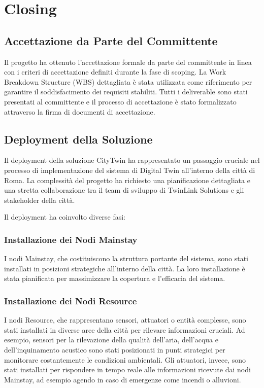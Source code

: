 \chapter{Closing}

\section{Accettazione da Parte del Committente}
Il progetto ha ottenuto l'accettazione formale da parte del committente in linea con i criteri di accettazione definiti durante la fase di scoping. La Work Breakdown Structure (WBS) dettagliata è stata utilizzata come riferimento per garantire il soddisfacimento dei requisiti stabiliti. Tutti i deliverable sono stati presentati al committente e il processo di accettazione è stato formalizzato attraverso la firma di documenti di accettazione.

\section{Deployment della Soluzione}
Il deployment della soluzione CityTwin ha rappresentato un passaggio cruciale nel processo di implementazione del sistema di Digital Twin all'interno della città di Roma. La complessità del progetto ha richiesto una pianificazione dettagliata e una stretta collaborazione tra il team di sviluppo di TwinLink Solutions e gli stakeholder della città.

Il deployment ha coinvolto diverse fasi:

\subsection{Installazione dei Nodi Mainstay}

I nodi Mainstay, che costituiscono la struttura portante del sistema, sono stati installati in posizioni strategiche all'interno della città. La loro installazione è stata pianificata per massimizzare la copertura e l'efficacia del sistema.

\subsection{Installazione dei Nodi Resource}

I nodi Resource, che rappresentano sensori, attuatori o entità complesse, sono stati installati in diverse aree della città per rilevare informazioni cruciali. Ad esempio, sensori per la rilevazione della qualità dell'aria, dell'acqua e dell'inquinamento acustico sono stati posizionati in punti strategici per monitorare costantemente le condizioni ambientali. Gli attuatori, invece, sono stati installati per rispondere in tempo reale alle informazioni ricevute dai nodi Mainstay, ad esempio agendo in caso di emergenze come incendi o alluvioni.

